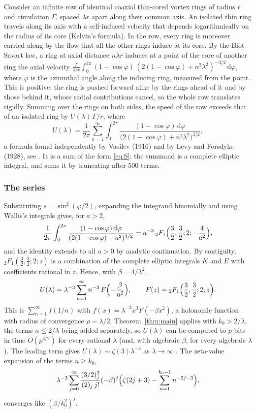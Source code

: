 \documentclass[11pt]{amsart}
\theoremstyle{definition}
\theoremstyle{remark}
\newcommand{\dd}{\,\mathrm{d}}
\begin{document}
Consider an infinite row of identical coaxial thin-cored vortex rings of radius $r$ and circulation $\Gamma$, spaced
$\lambda r$ apart along their common axis. An isolated thin ring travels along its axis with a self-induced velocity
that depends logarithmically on the radius of its core (Kelvin's formula). In the row, every ring is moreover carried
along by the flow that all the other rings induce at its core. By the Biot--Savart law, a ring at axial distance
$n\lambda r$ induces at a point of the core of another ring the axial velocity
$\frac{\Gamma}{4\pi r}\int_0^{2\pi}(1-\cos\varphi)\,(2(1-\cos\varphi)+n^2\lambda^2)^{-3/2}\dd\varphi$, where $\varphi$ is the
azimuthal angle along the inducing ring, measured from the point. This is positive: the ring is pushed forward
alike by the rings ahead of it and by those behind it, whose radial contributions cancel, so the whole row translates
rigidly. Summing over the rings on both sides, the speed of the row exceeds that of an isolated ring by
$U(\lambda)\,\Gamma/r$, where
\begin{equation}\label{eq:vortex}
  U(\lambda) = \frac{1}{2\pi}\sum_{n=1}^{\infty}\int_0^{2\pi}\frac{(1-\cos\varphi)\dd\varphi}{\bigl(2(1-\cos\varphi)+n^2\lambda^2\bigr)^{3/2}},
\end{equation}
a formula found independently by Vasilev (1916) and by Levy and Forsdyke (1928), see \cite{MS22}. It is a sum of the
form \eqref{eq:S}: the summand is a complete elliptic integral, and \cite{MS22} sums it by truncating after $500$ terms.

\subsubsection{The series}
Substituting $s = \sin^2(\varphi/2)$, expanding the integrand binomially and using Wallis's integrals gives, for $a > 2$,
\[
  \frac1{2\pi}\int_0^{2\pi}\frac{(1-\cos\varphi)\dd\varphi}{(2(1-\cos\varphi)+a^2)^{3/2}}
  = a^{-3}\,{}_2F_1\Bigl(\frac32,\frac32;2;-\frac4{a^2}\Bigr),
\]
and the identity extends to all $a > 0$ by analytic continuation. By contiguity, ${}_2F_1(\frac32,\frac32;2;z)$ is a
combination of the complete elliptic integrals $K$ and $E$ with coefficients rational in $z$. Hence, with
$\beta = 4/\lambda^2$,
\[
  U(\lambda) = \lambda^{-3}\sum_{n=1}^{\infty} n^{-3}\,F\Bigl(-\frac{\beta}{n^2}\Bigr), \qquad F(z) = {}_2F_1\Bigl(\frac32,\frac32;2;z\Bigr).
\]
This is $\sum_{n=1}^{\infty} f(1/n)$ with $f(x) = \lambda^{-3}x^3F(-\beta x^2)$, a holonomic function with radius of convergence
$\rho = \lambda/2$. Theorem~\ref{thm:main} applies with $k_0 > 2/\lambda$, the terms $n \le 2/\lambda$ being added
separately, so $U(\lambda)$ can be computed to $p$ bits in time $\widetilde O(p^{3/2})$ for every rational $\lambda$ (and,
with algebraic $\beta$, for every algebraic $\lambda$). The leading term gives $U(\lambda) \sim \zeta(3)\lambda^{-3}$ as
$\lambda \to \infty$ \cite{MS22}. The zeta-value expansion of the terms $n \ge k_0$,
\[
  \lambda^{-3}\sum_{j=0}^{\infty}\frac{(3/2)_j^2}{(2)_j\,j!}(-\beta)^j\Bigl(\zeta(2j+3) - \sum_{n=1}^{k_0-1}n^{-2j-3}\Bigr),
\]
converges like $(\beta/k_0^2)^j$.
\end{document}
